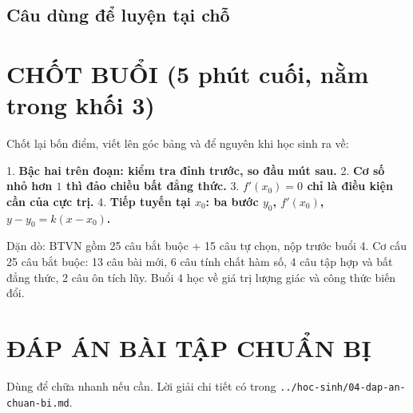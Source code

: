 \documentclass[11pt, a4paper]{article}
\begin{document}
\subsection{Câu dùng để luyện tại chỗ}


\section{CHỐT BUỔI (5 phút cuối, nằm trong khối 3)}

Chốt lại bốn điểm, viết lên góc bảng và để nguyên khi học sinh ra về:

1. \textbf{Bậc hai trên đoạn: kiểm tra đỉnh trước, so đầu mút sau.}
2. \textbf{Cơ số nhỏ hơn $1$ thì đảo chiều bất đẳng thức.}
3. \textbf{$f'(x_0) = 0$ chỉ là điều kiện cần của cực trị.}
4. \textbf{Tiếp tuyến tại $x_0$: ba bước $y_0$, $f'(x_0)$, $y - y_0 = k(x - x_0)$.}

Dặn dò: BTVN gồm 25 câu bắt buộc + 15 câu tự chọn, nộp trước buổi 4. Cơ cấu 25 câu bắt buộc: 13 câu bài mới, 6 câu tính chất hàm số, 4 câu tập hợp và bất đẳng thức, 2 câu ôn tích lũy. Buổi 4 học về giá trị lượng giác và công thức biến đổi.

\section{ĐÁP ÁN BÀI TẬP CHUẨN BỊ}

Dùng để chữa nhanh nếu cần. Lời giải chi tiết có trong \texttt{../hoc-sinh/04-dap-an-chuan-bi.md}.
\end{document}

